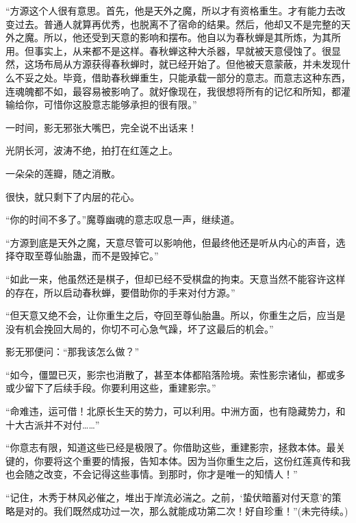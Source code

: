 \begin{this_body}
“方源这个人很有意思。首先，他是天外之魔，所以才有资格重生。才有能力去改变过去。普通人就算再优秀，也脱离不了宿命的结果。然后，他却又不是完整的天外之魔。所以，他还受到天意的影响和摆布。他自以为春秋蝉是其所炼，为其所用。但事实上，从来都不是这样。春秋蝉这种大杀器，早就被天意侵蚀了。很显然，这场布局从方源获得春秋蝉时，就已经开始了。但他被天意蒙蔽，并未发现什么不妥之处。毕竟，借助春秋蝉重生，只能承载一部分的意志。而意志这种东西，连魂魄都不如，最容易被影响了。就好像现在，我很想将所有的记忆和所知，都灌输给你，可惜你这股意志能够承担的很有限。”

一时间，影无邪张大嘴巴，完全说不出话来！

光阴长河，波涛不绝，拍打在红莲之上。

一朵朵的莲瓣，随之消散。

很快，就只剩下了内层的花心。

“你的时间不多了。”魔尊幽魂的意志叹息一声，继续道。

“方源到底是天外之魔，天意尽管可以影响他，但最终他还是听从内心的声音，选择夺取至尊仙胎蛊，而不是毁掉它。”

“如此一来，他虽然还是棋子，但却已经不受棋盘的拘束。天意当然不能容许这样的存在，所以启动春秋蝉，要借助你的手来对付方源。”

“但天意又绝不会，让你重生之后，夺回至尊仙胎蛊。所以，你重生之后，应当是没有机会挽回大局的，你切不可心急气躁，坏了这最后的机会。”

影无邪便问：“那我该怎么做？”

“如今，僵盟已灭，影宗也消散了，甚至本体都陷落险境。索性影宗诸仙，都或多或少留下了后续手段。你要利用这些，重建影宗。”

“命难违，运可借！北原长生天的势力，可以利用。中洲方面，也有隐藏势力，和十大古派并不对付……”

“你意志有限，知道这些已经是极限了。你借助这些，重建影宗，拯救本体。最关键的，你要将这个重要的情报，告知本体。因为当你重生之后，这份红莲真传和我也会随之改变，不会记得这些事情。到那时，你才是唯一的知情人！”

“记住，木秀于林风必催之，堆出于岸流必湍之。之前，‘蛰伏暗蓄对付天意’的策略是对的。我们既然成功过一次，那么就能成功第二次！好自珍重！”(未完待续。)

\end{this_body}

